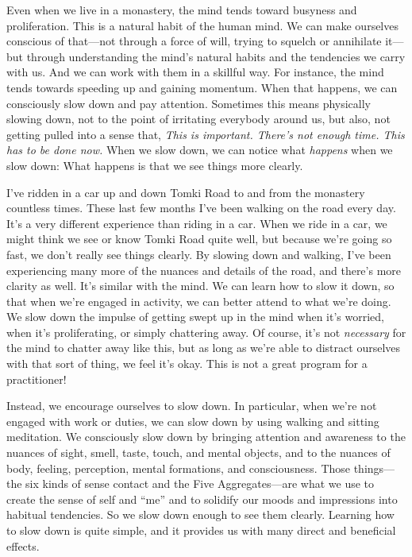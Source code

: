 
Even when we live in a monastery, the mind tends toward busyness and 
proliferation. This is a natural habit of the human mind. We can make 
ourselves conscious of that---not through a force of will, trying to 
squelch or annihilate it---but through understanding the mind's natural 
habits and the tendencies we carry with us. And we can work with them 
in a skillful way. For instance, the mind tends towards speeding up and 
gaining momentum. When that happens, we can consciously slow down and 
pay attention. Sometimes this means physically slowing down, not to the 
point of irritating everybody around us, but also, not getting pulled 
into a sense that, \emph{This is important. There's not enough time. 
This has to be done now.} When we slow down, we can notice what 
\emph{happens} when we slow down: What happens is that we see things 
more clearly.

I've ridden in a car up and down Tomki Road to and from the monastery 
countless times. These last few months I've been walking on the road 
every day. It's a very different experience than riding in a car. When 
we ride in a car, we might think we see or know Tomki Road quite well, 
but because we're going so fast, we don't really see things clearly. By 
slowing down and walking, I've been experiencing many more of the 
nuances and details of the road, and there's more clarity as well. It's 
similar with the mind. We can learn how to slow it down, so that when 
we're engaged in activity, we can better attend to what we're doing. We 
slow down the impulse of getting swept up in the mind when it's 
worried, when it's proliferating, or simply chattering away. Of course, 
it's not \emph{necessary} for the mind to chatter away like this, but 
as long as we're able to distract ourselves with that sort of thing, we 
feel it's okay. This is not a great program for a practitioner!

Instead, we encourage ourselves to slow down. In particular, when we're 
not engaged with work or duties, we can slow down by using walking and 
sitting meditation. We consciously slow down by bringing attention and 
awareness to the nuances of sight, smell, taste, touch, and mental 
objects, and to the nuances of body, feeling, perception, mental 
formations, and consciousness. Those things---the six kinds of sense 
contact and the Five Aggregates---are what we use to create the sense 
of self and ``me'' and to solidify our moods and impressions into 
habitual tendencies. So we slow down enough to see them clearly. 
Learning how to slow down is quite simple, and it provides us with many 
direct and beneficial effects.

